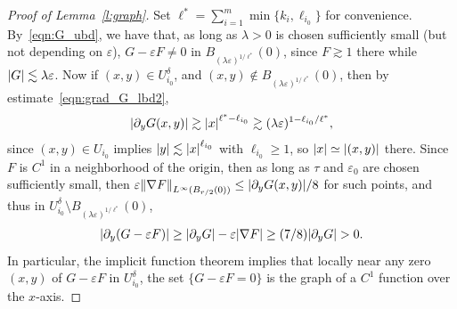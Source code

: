 \documentclass[10pt]{amsart}
\theoremstyle{definition}\newtheorem{defi}[theo]{Definition}\newtheorem{rema}[theo]{Remark}\newtheorem{exam}[theo]{Example}\newtheorem{exem}[theo]{Example}\newtheorem{nota}[theo]{Notation}
\newcommand{\norm}[1]{\left \lVert #1 \right \rVert}
\newcommand{\abs}[1]{\left \lvert #1 \right \rvert}
\renewcommand{\epsilon}{\varepsilon}
\let\originalleft\left
\let\originalright\right
\renewcommand{\left}{\mathopen{}\mathclose\bgroup\originalleft}
\renewcommand{\right}{\aftergroup\egroup\originalright}
\begin{document}
\begin{proof}[Proof of Lemma~\ref{l:graph}]
Set $\ell^* = \sum_{i=1}^m \min\{k_i, \ell_{i_0}\}$ for convenience. By~\eqref{eqn:G_ubd}, we have that, as long as $\lambda >0$ is chosen sufficiently small (but not depending on $\epsilon$), $G - \epsilon F \ne 0$ in $B_{(\lambda \epsilon)^{1/\ell^*}}(0)$, since $F \gtrsim 1$ there while $\abs{G} \lesssim \lambda \epsilon$. Now if $(x,y) \in U_{i_0}^\delta$, and $(x,y) \not \in B_{(\lambda \epsilon)^{1/\ell^*}}(0)$, then by estimate~\eqref{eqn:grad_G_lbd2},
\begin{align*}
\abs{\partial_y G(x,y)} \gtrsim \abs{x}^{\ell^* - \ell_{i_0}} \gtrsim (\lambda \epsilon)^{1 - \ell_{i_0}/\ell^*},
\end{align*}
since $(x,y) \in U_{i_0}$ implies $\abs{y} \lesssim \abs{x}^{\ell_{i_0}}$ with $\ell_{i_0} \ge 1$, so $\abs{x} \simeq \abs{(x,y)}$ there. Since $F$ is $C^1$ in a neighborhood of the origin, then as long as $\tau$ and $\epsilon_0$ are chosen sufficiently small, then $\epsilon \norm{\nabla F}_{L^\infty(B_{r/2}(0))} \le \abs{ \partial_y G(x,y)}/8$ for such points, and thus in $U_{i_0}^\delta \setminus B_{(\lambda \epsilon)^{1/\ell^*}}(0) $,
\begin{align}
\abs{\partial_y(G - \epsilon F)} \ge \abs{\partial_y G} - \epsilon \abs{\nabla F} \ge (7/8) \abs{\partial_y G} > 0. \label{eqn:grad_H_lbd}
\end{align}
In particular, the implicit function theorem implies that locally near any zero $(x, y)$ of $G - \epsilon F$ in $U_{i_0}^\delta$, the set $\{G - \epsilon F = 0\}$ is the graph of a $C^1$ function over the $x$-axis.


\end{proof}
\end{document}
